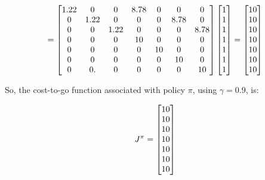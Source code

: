 \documentclass{article}
\begin{document}
\begin{equation}
    \notag
    = 
    \begin{bmatrix}
        1.22 & 0 & 0 & 8.78 & 0 & 0 & 0 \\ 
        0 & 1.22 & 0 & 0 & 0 & 8.78 & 0 \\ 
        0 & 0 & 1.22 & 0 & 0 & 0 & 8.78 \\
        0 & 0 & 0 & 10 & 0 & 0 & 0 \\  
        0 & 0 & 0 & 0 & 10 & 0 & 0 \\ 
        0 & 0 & 0 & 0 & 0 & 10 & 0 \\  
        0 & 0.& 0 & 0 & 0 & 0 & 10 \\
    \end{bmatrix}
    \begin{bmatrix}
        1 \\
        1 \\
        1 \\
        1 \\
        1 \\
        1 \\
        1 \\
    \end{bmatrix} = 
    \begin{bmatrix}
        10 \\
        10 \\
        10 \\
        10 \\
        10 \\
        10 \\
        10 \\
    \end{bmatrix}
\end{equation}

\medskip

So, the cost-to-go function associated with policy $\pi$, using $\gamma = 0.9$, is: 

\begin{equation}
    \notag
    J^\pi = 
    \begin{bmatrix}
        10 \\
        10 \\
        10 \\
        10 \\
        10 \\
        10 \\
        10 \\
    \end{bmatrix}
\end{equation}
\end{document}
